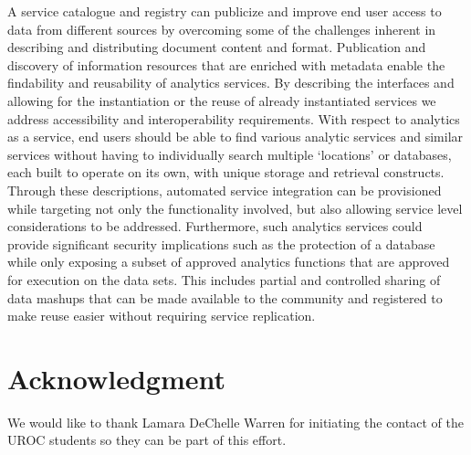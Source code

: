 \documentclass[fullpage,12pt]{article}
\begin{document}
A service catalogue and registry can publicize and improve end user access to data from different sources by overcoming some of the challenges inherent in describing and distributing document content and format. Publication and discovery of information resources that are enriched with metadata enable the findability and reusability of analytics services. By describing the interfaces and allowing for the instantiation or the reuse of already instantiated services we address accessibility and interoperability requirements. With respect to analytics as a service, end users should be able to find various analytic services and similar services without having to individually search multiple ‘locations’ or databases, each built to operate on its own, with unique storage and retrieval constructs. Through these descriptions, automated service integration can be provisioned while targeting not only the functionality involved, but also allowing service level considerations to be addressed. Furthermore, such analytics services could provide significant security implications such as the protection of a database while only exposing a subset of approved analytics functions that are approved for execution on the data sets. This includes partial and controlled sharing of data mashups that can be made available to the community and registered to make reuse easier without requiring service replication.

\section*{Acknowledgment}

We would like to thank Lamara DeChelle Warren for initiating the contact of the UROC students so they can be part of this effort. 



\end{document}
